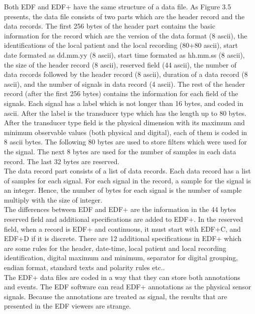         Both EDF and EDF+ have the same structure of a data file. As Figure 3.5 presents, the data file consists of two parts which are the header record and the data records. The first 256 bytes of the header part contains the basic information for the record which are the version of the data format (8 ascii), the identifications of the local patient and the local recording (80+80 ascii), start date formated as dd.mm.yy (8 ascii), start time formated as hh.mm.ss (8 ascii), the size of the header record (8 ascii), reserved field (44 ascii), the number of data records followed by the header record (8 ascii), duration of a data record (8 ascii), and the number of signals in data record (4 ascii). The rest of the header record (after the first 256 bytes) contains the information for each field of the signals. Each signal has a label which is not longer than 16 bytes, and coded in ascii. After the label is the transducer type which has the length up to 80 bytes. After the transducer type field is the physical dimension with its maximum and minimum observable values (both physical and digital), each of them is coded in 8 ascii bytes. The following 80 bytes are used to store filters which were used for the signal. The next 8 bytes are used for the number of samples in each data record. The last 32 bytes are reserved.\\
        The data record part consists of a list of data records. Each data record has a list of samples for each signal. For each signal in the record, a sample for the signal is an integer. Hence, the number of bytes for each signal is the number of sample multiply with the size of integer.\\
        The differences between EDF and EDF+ are the information in the 44 bytes reserved field and additional specifications are added to EDF+. In the reserved field, when a record is EDF+ and continuous, it must start with EDF+C, and EDF+D if it is discrete. There are 12 additional specifications in EDF+ which are some rules for the header, date-time, local patient and local recording identification, digital maximum and minimum, separator for digital grouping, endian format, standard texts and polarity rules etc.\citep{EDFpluss}.\\
        The EDF+ data files are coded in a way that they can store both annotations and events. The EDF software can read EDF+ annotations as the physical sensor signals. Because the annotations are treated as signal, the results that are presented in the EDF viewers are strange.\\
